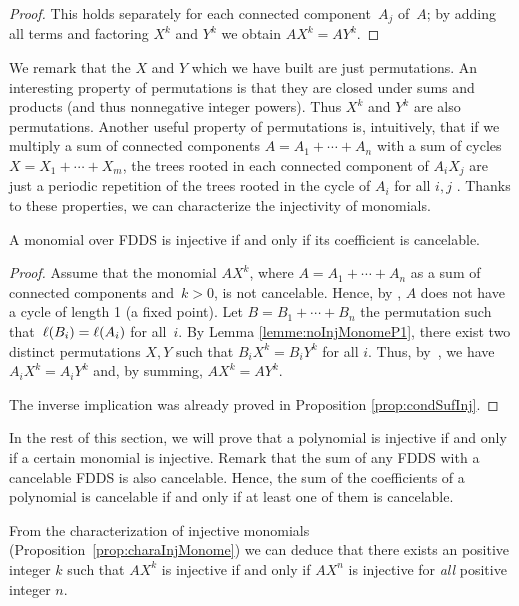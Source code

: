 \begin{proof}
                This holds separately for each connected component~$A_j$ of~$A$; by adding all terms and factoring $X^k$ and $Y^k$ we obtain $AX^k = AY^k$.
	\end{proof}
	
	We remark that the $X$ and $Y$ which we have built are just permutations. 
	An interesting property of permutations is that they are closed under sums and products (and thus nonnegative integer powers).
	Thus $X^k$ and $Y^k$ are also permutations.
	Another useful property of permutations is, intuitively, that if we multiply a sum of connected components $A = A_1 + \cdots + A_n$ with a sum of cycles $X = X_1 + \cdots + X_m$, the trees rooted in each connected component of $A_i X_j$ are just a periodic repetition of the trees rooted in the cycle of $A_i$ for all $i,j$ \cite[Corollary 14]{article_arbre}.
	Thanks to these properties, we can characterize the injectivity of monomials.
	
	\begin{proposition}\label{prop:charaInjMonome}
		A monomial over FDDS is injective if and only if its coefficient is cancelable.
	\end{proposition}
	
	\begin{proof}
		Assume that the monomial $AX^k$, where $A = A_1 + \cdots + A_n$ as a sum of connected components and~$k>0$, is not cancelable. Hence, by \cite[Theorem 34]{article_arbre}, $A$ does not have a cycle of length 1 (a fixed point).
		Let $B = B_1 + \cdots + B_n$ the permutation such that~$\ell(B_i) = \ell(A_i)$ for all~$i$.
		By Lemma \ref{lemme:noInjMonomeP1}, there exist two distinct permutations $X,Y$ such that $B_i X^k = B_i Y^k$ for all $i$. 
		Thus, by~\cite[Corollary 14]{article_arbre}, we have $A_i X^k = A_i Y^k$ and, by summing, $A X^k = A Y^k$.

		The inverse implication was already proved in Proposition \ref{prop:condSufInj}.
        \end{proof}
	
	In the rest of this section, we will prove that a polynomial is injective if and only if a certain monomial is injective.
	Remark that the sum of any FDDS with a cancelable FDDS is also cancelable.
	Hence, the sum of the coefficients of a polynomial is cancelable if and only if at least one of them is cancelable.
	
	From the characterization of injective monomials (Proposition~\ref{prop:charaInjMonome}) we can deduce that there exists an positive integer $k$ such that $A X^k$ is injective if and only if $A X^n$ is injective for \emph{all} positive integer $n$.
	
